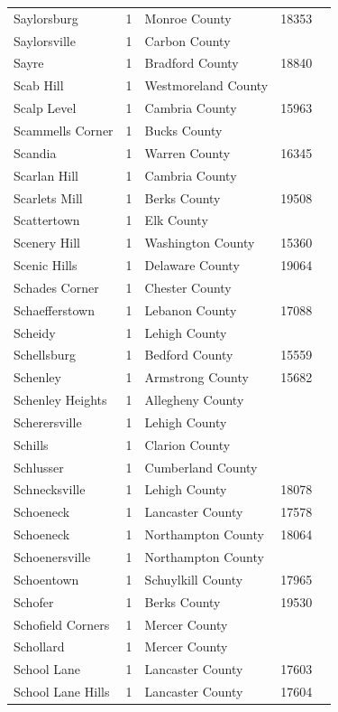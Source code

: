 \documentclass{article}
\begin{document}
\begin{tabular}{lllll}
Saylorsburg & 1 & Monroe County & 18353 &  \\
Saylorsville & 1 & Carbon County &  &  \\
Sayre & 1 & Bradford County & 18840 &  \\
Scab Hill & 1 & Westmoreland County &  &  \\
Scalp Level & 1 & Cambria County & 15963 &  \\
Scammells Corner & 1 & Bucks County &  &  \\
Scandia & 1 & Warren County & 16345 &  \\
Scarlan Hill & 1 & Cambria County &  &  \\
Scarlets Mill & 1 & Berks County & 19508 &  \\
Scattertown & 1 & Elk County &  &  \\
Scenery Hill & 1 & Washington County & 15360 &  \\
Scenic Hills & 1 & Delaware County & 19064 &  \\
Schades Corner & 1 & Chester County &  &  \\
Schaefferstown & 1 & Lebanon County & 17088 &  \\
Scheidy & 1 & Lehigh County &  &  \\
Schellsburg & 1 & Bedford County & 15559 &  \\
Schenley & 1 & Armstrong County & 15682 &  \\
Schenley Heights & 1 & Allegheny County &  &  \\
Scherersville & 1 & Lehigh County &  &  \\
Schills & 1 & Clarion County &  &  \\
Schlusser & 1 & Cumberland County &  &  \\
Schnecksville & 1 & Lehigh County & 18078 &  \\
Schoeneck & 1 & Lancaster County & 17578 &  \\
Schoeneck & 1 & Northampton County & 18064 &  \\
Schoenersville & 1 & Northampton County &  &  \\
Schoentown & 1 & Schuylkill County & 17965 &  \\
Schofer & 1 & Berks County & 19530 &  \\
Schofield Corners & 1 & Mercer County &  &  \\
Schollard & 1 & Mercer County &  &  \\
School Lane & 1 & Lancaster County & 17603 &  \\
School Lane Hills & 1 & Lancaster County & 17604 &  \\

\end{tabular}
\end{document}
